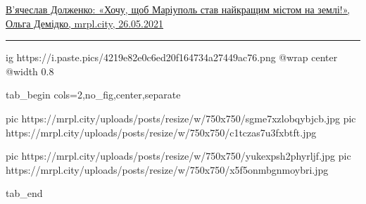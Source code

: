  
 
 
 
 

\qqSecCmt


\href{https://mrpl.city/blogs/view/vyacheslav-dolzhenko-hochu-shhob-mariupol-stav-najkrashhim-mistom-na-zemli}{%
В'ячеслав Долженко: «Хочу, щоб Маріуполь став найкращим містом на землі!»,%
Ольга Демідко, mrpl.city, 26.05.2021%
}

\par\noindent\rule{\textwidth}{0.4pt}

\ifcmt
  ig https://i.paste.pics/4219e82e0c6ed20f164734a27449ac76.png
  @wrap center
  @width 0.8
\fi

\ifcmt
  tab_begin cols=2,no_fig,center,separate

		 pic https://mrpl.city/uploads/posts/resize/w/750x750/sgme7xzlobqybjcb.jpg
		 pic https://mrpl.city/uploads/posts/resize/w/750x750/c1tczas7u3fxbtft.jpg

		 pic https://mrpl.city/uploads/posts/resize/w/750x750/yukexpsh2phyrljf.jpg
     pic https://mrpl.city/uploads/posts/resize/w/750x750/x5f5onmbgnmoybri.jpg

  tab_end
\fi

